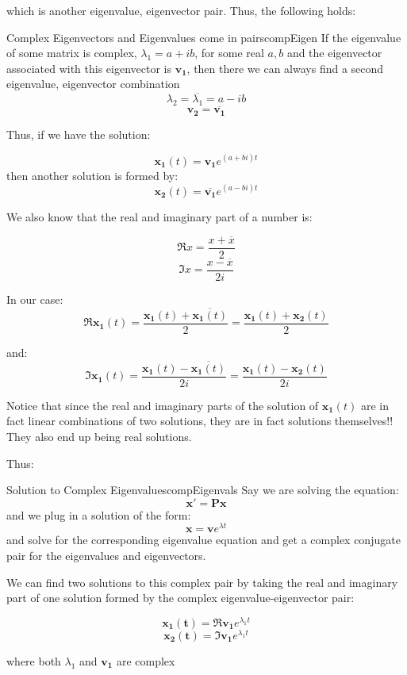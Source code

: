 \documentclass{report}
\begin{document}
which is another eigenvalue, eigenvector pair. Thus, the following holds:

\begin{mytheo}{Complex Eigenvectors and Eigenvalues come in pairs}{compEigen}
    If the eigenvalue of some matrix is complex, $\lambda_1 = a + ib$, for some real $a,b$ and the eigenvector associated with this eigenvector is $\mathbf{v_1}$, then there we can always find a second eigenvalue, eigenvector combination 
    $$\lambda_2 = \overline{\lambda_1} = a - ib$$
    $$\mathbf{v_2} = \overline{\mathbf{v_1}}$$
\end{mytheo}


Thus, if we have the solution:

$$\mathbf{x_1}(t)=\mathbf{v_1}e^{(a+bi) t}$$
then another solution is formed by:
$$\mathbf{x_2}(t)=\overline{\mathbf{v_1}}e^{(a-bi) t}$$

We also know that the real and imaginary part of a number is:

$$\Re{x} = \frac{x+\overline{x}}{2}$$
$$\Im{x} = \frac{x-\overline{x}}{2i}$$

In our case:
$$\Re{\mathbf{x_1}(t)} = \frac{\mathbf{x_1}(t)+\overline{\mathbf{x_1}(t)}}{2}=\frac{\mathbf{x_1}(t)+\mathbf{x_2}(t)}{2}$$

and:
$$\Im{\mathbf{x_1}(t)} = \frac{\mathbf{x_1}(t)-\overline{\mathbf{x_1}(t)}}{2i}=\frac{\mathbf{x_1}(t)-\mathbf{x_2}(t)}{2i}$$

Notice that since the real and imaginary parts of the solution of $\mathbf{x_1}(t)$ are in fact linear combinations of two solutions, they are in fact solutions themselves!! They also end up being real solutions.

Thus:
\begin{mytheo}{Solution to Complex Eigenvalues}{compEigenvals}
    Say we are solving the equation:
    $$\mathbf{x'} = \mathbf{Px}$$
    and we plug in a solution of the form:
    $$\mathbf{x} = \mathbf{v}e^{\lambda t}$$
    and solve for the corresponding eigenvalue equation and get a complex conjugate pair for the eigenvalues and eigenvectors.
    
    We can find two solutions to this complex pair by taking the real and imaginary part of one solution formed by the complex eigenvalue-eigenvector pair:
    
    $$\mathbf{x_1(t)} = \Re{\mathbf{v_1}e^{\lambda_1 t}}$$
    $$\mathbf{x_2(t)} = \Im{\mathbf{v_1}e^{\lambda_1 t}}$$
    
    where both $\lambda_1$ and $\mathbf{v_1}$ are complex
\end{mytheo}
\end{document}
